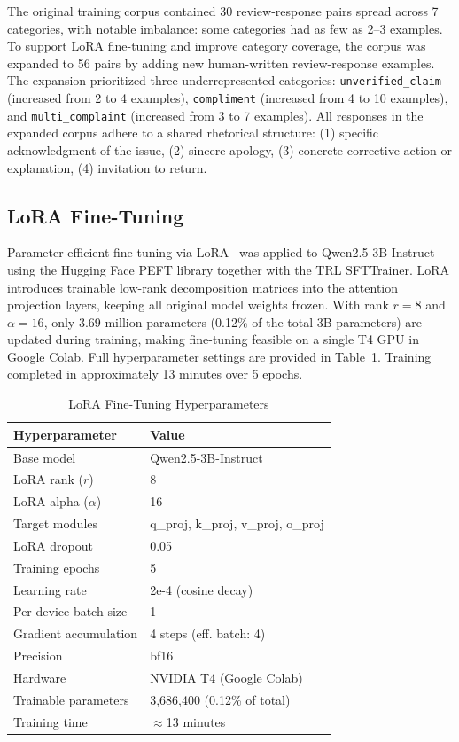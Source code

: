 \documentclass[conference]{IEEEtran}
\begin{document}
The original training corpus contained 30 review-response pairs spread
across 7 categories, with notable imbalance: some categories had as
few as 2--3 examples.
To support LoRA fine-tuning and improve category coverage, the corpus
was expanded to 56 pairs by adding new human-written review-response
examples.
The expansion prioritized three underrepresented categories:
\texttt{unverified\_claim} (increased from 2 to 4 examples),
\texttt{compliment} (increased from 4 to 10 examples), and
\texttt{multi\_complaint} (increased from 3 to 7 examples).
All responses in the expanded corpus adhere to a shared rhetorical
structure:
(1) specific acknowledgment of the issue,
(2) sincere apology,
(3) concrete corrective action or explanation,
(4) invitation to return.

\subsection{LoRA Fine-Tuning}

Parameter-efficient fine-tuning via LoRA~\cite{lora2022} was applied
to Qwen2.5-3B-Instruct using the Hugging Face PEFT library together
with the TRL SFTTrainer.
LoRA introduces trainable low-rank decomposition matrices into the
attention projection layers, keeping all original model weights frozen.
With rank $r = 8$ and $\alpha = 16$, only 3.69 million parameters
(0.12\% of the total 3B parameters) are updated during training, making
fine-tuning feasible on a single T4 GPU in Google Colab.
Full hyperparameter settings are provided in Table~\ref{tab:lora}.
Training completed in approximately 13 minutes over 5 epochs.

\begin{table}[t]
\centering
\caption{LoRA Fine-Tuning Hyperparameters}
\label{tab:lora}
\begin{tabular}{ll}
\toprule
\textbf{Hyperparameter} & \textbf{Value} \\
\midrule
Base model               & Qwen2.5-3B-Instruct \\
LoRA rank ($r$)          & 8 \\
LoRA alpha ($\alpha$)    & 16 \\
Target modules           & q\_proj, k\_proj, v\_proj, o\_proj \\
LoRA dropout             & 0.05 \\
Training epochs          & 5 \\
Learning rate            & 2e-4 (cosine decay) \\
Per-device batch size    & 1 \\
Gradient accumulation    & 4 steps (eff. batch: 4) \\
Precision                & bf16 \\
Hardware                 & NVIDIA T4 (Google Colab) \\
Trainable parameters     & 3,686,400 (0.12\% of total) \\
Training time            & $\approx$13 minutes \\
\bottomrule
\end{tabular}
\end{table}
\end{document}
